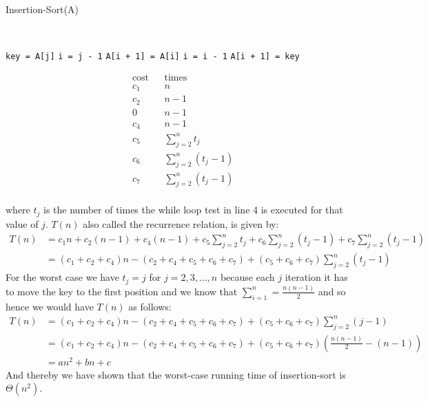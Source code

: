 \begin{algorithm}[H]
  \caption{Insertion-Sort(A)}
  \AlgoTopMargin
   \\
  \begin{multicols}{2}
    \begin{algorithmic}[1]
      \State \texttt{key = A[j]}
      \State \texttt{i = j - 1}
      \State \texttt{A[i + 1] = A[i]}
      \State \texttt{i = i - 1}
      \EndWhile
      \State \texttt{A[i + 1] = key}
      \EndFor
    \end{algorithmic}

    \columnbreak
    \vspace*{-8.8em}
    \begin{align*}
       & \text{cost} &  & \text{times}                       \\[3.8em]
       & c_1         &  & n                                  \\[-0.4em]
       & c_2         &  & n - 1                              \\[-0.2em]
       & 0           &  & n - 1                              \\[-0.3em]
       & c_4         &  & n - 1                              \\[0.68em]
       & c_5         &  & \textstyle \sum_{j=2}^{n}t_j       \\[-0.3em]
       & c_6         &  & \textstyle \sum_{j=2}^{n}(t_j - 1) \\[-0.4em]
       & c_7         &  & \textstyle \sum_{j=2}^{n}(t_j - 1) \\
    \end{align*}
  \end{multicols}
\end{algorithm}
where $t_j$ is the number of times the while loop test in line 4 is executed for that value of $j$. $T(n)$ also called the recurrence relation, is given by:
\begin{align*}
  T(n) & = c_1n + c_2(n - 1) + c_4(n - 1) + c_5\sum_{j=2}^{n}t_j + c_6\sum_{j=2}^{n}(t_j - 1) + c_7\sum_{j=2}^{n}(t_j - 1) \\
       & = (c_1 + c_2 + c_4)n - (c_2 + c_4 + c_5 + c_6 + c_7) + (c_5 + c_6 + c_7)\sum_{j=2}^{n}(t_j - 1)
\end{align*}
For the worst case we have $t_j = j$ for $j = 2, 3, \ldots, n$ because each $j$ iteration it has to move the key to the first position and we know that $\textstyle \sum_{i=1}^n = \frac{n(n - 1)}{2}$ and so hence we would have $T(n)$ as follows:
\begin{align*}
  T(n) & = (c_1 + c_2 + c_4)n - (c_2 + c_4 + c_5 + c_6 + c_7) + (c_5 + c_6 + c_7)\sum_{j=2}^{n}(j - 1)                     \\
       & = (c_1 + c_2 + c_4)n - (c_2 + c_4 + c_5 + c_6 + c_7) + (c_5 + c_6 + c_7)\left(\frac{n(n - 1)}{2} - (n - 1)\right) \\
       & = an^2 + bn + c
\end{align*}
And thereby we have shown that the worst-case running time of insertion-sort is $\Theta(n^2)$.


